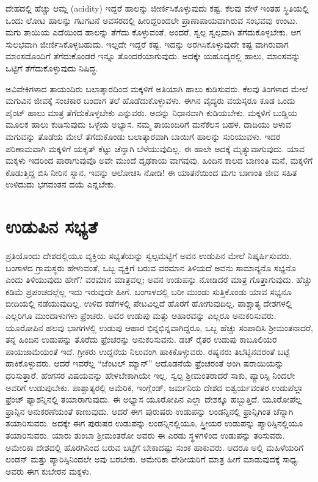 ದೇಹದಲ್ಲಿ ಹೆಚ್ಚು ಆಮ್ಲ (acidity) ಇದ್ದರೆ ಹಾಲನ್ನು ಜೀರ್ಣಿಸಿಕೊಳ್ಳುವುದು ಕಷ್ಟ. ಕೆಲವು ವೇಳೆ ಇಂತಹ ಸ್ಥಿತಿಯಲ್ಲಿ ಒಂದು ಲೋಟ ಹಾಲನ್ನು ಗಟಗಟನೆ ಅವಸರದಲ್ಲಿ ಹೀರಿದ್ದರಿಂದಲೇ ಪ್ರಾಣಾಪಾಯವಾಗಿರುವ ಸಂಭವವು ಉಂಟು. ಮಗು ತಾಯಿಯ ಎದೆಯಿಂದ ಹಾಲನ್ನು ತೆಗೆದು ಕೊಳ್ಳುವಂತೆ, ಅಂದರೆ, ಸ್ವಲ್ಪ ಸ್ವಲ್ಪವಾಗಿ ತೆಗೆದುಕೊಳ್ಳಬೇಕು. ಆಗ ಸುಲಭವಾಗಿ ಜೀರ್ಣಿಸಿಕೊಳ್ಳಬಹುದು. ಇಲ್ಲದೇ ಇದ್ದರೆ ಕಷ್ಟ. ಇದನ್ನು ಅರಗಿಸಿಕೊಳ್ಳು\break ವುದೇ ಕಷ್ಟ ವಾಗಿರುವಾಗ ಮಾಂಸದೊಂದಿಗೆ ತೆಗೆದುಕೊಂಡರೆ ಇನ್ನೂ ತೊಂದರೆಯಾಗು\break ವುದು. ಅದಕ್ಕೇ ಯಹೂದ್ಯರಲ್ಲಿ ಹಾಲು, ಮಾಂಸವನ್ನು ಒಟ್ಟಿಗೆ ತೆಗೆದುಕೊಳ್ಳುವುದು ನಿಷಿದ್ಧ.

ಅವಿವೇಕಿಗಳಾದ ತಾಯಂದಿರು ಬಲಾತ್ಕಾರದಿಂದ ಮಕ್ಕಳಿಗೆ ಅತಿಯಾಗಿ ಹಾಲು ಕುಡಿಸುವರು. ಕೆಲವು ತಿಂಗಳಾದ ಮೇಲೆ ಮಗುವಿನ ಜೀವಕ್ಕೆ ಸಂಚಕಾರ ಬಂದಾಗ ತಲೆ ಹೊಡೆದುಕೊಳ್ಳುವಳು. ಈಗಿನ ವೈದ್ಯರು ವಯಸ್ಕರೂ ಕೂಡ ಒಂದು ಪೈಂಟ್​ ಹಾಲು ಮಾತ್ರ ತೆಗೆದುಕೊಳ್ಳಬೇಕು ಎನ್ನುವರು. ಅದನ್ನು ನಿಧಾನವಾಗಿ ಕುಡಿಯಬೇಕು. ಮಕ್ಕಳಿಗೆ ಬುಡ್ಡಿಯ ಮೂಲಕ ಹಾಲು ಕುಡಿಸುವುದು ಒಳ್ಳೆಯ ಅಭ್ಯಾಸ. ನಮ್ಮ ತಾಯಂದಿರಿಗೆ ಮನೆಕೆಲಸ ಬಹಳ. ದಾದಿಯು ಅಳುವ ಮಗುವನ್ನು ತೊಡೆಯ ಮೇಲೆ ತೆಗೆದುಕೊಂಡು ಬಲಾತ್ಕಾರವಾಗಿ ಬಾಯಿಗೆ ಹಾಲನ್ನು ಸುರಿಯುವಳು. ಇದರ ಪರಿಣಾಮವಾಗಿ ಮಕ್ಕಳಿಗೆ ಯಕೃತ್​ ಕೆಟ್ಟು ಚೆನ್ನಾಗಿ ಬೆಳೆಯುವುದಿಲ್ಲ. ಈ ಹಾಲೇ ಅದಕ್ಕೆ ಮೃತ್ಯುವಾಗುವುದು. ಯಾವ ಮಕ್ಕಳು ಇದರಿಂದ ಪಾರಾಗುವುವೊ ಅವೇ ಮುಂದೆ ದೃಢಕಾಯ ವಾಗವುವು. ಹಿಂದಿನ ಕಾಲದ ಬಾಣಂತಿ ಮನೆ, ಮಕ್ಕಳಿಗೆ ಕೊಡುತ್ತಿದ್ದ ಬಿಸಿ ನೀರಿನ ಸ್ನಾನ, ಇವನ್ನು ಆಲೋಚಿಸಿ ನೋಡಿ! ಈ ಯಾತನೆಯಿಂದ ಮಗು ಬಾಣಂತಿ ಜೀವ ಸಹಿತ ಉಳಿದುದು ಭಗವಂತನ ದಯೆ ಎನ್ನಬೇಕು.

\newpage

\section*{ಉಡುಪಿನ ಸಭ್ಯತೆ}

ಪ್ರತಿಯೊಂದು ದೇಶದಲ್ಲಿಯೂ ವ್ಯಕ್ತಿಯ ಸಭ್ಯತೆಯನ್ನು ಸ್ವಲ್ಪಮಟ್ಟಿಗೆ ಅವನ ಉಡುಪಿನ ಮೇಲೆ ನಿಷ್ಕರ್ಷಿಸುವರು. ಬಂಗಾಳದ ಗ್ರಾಮಸ್ಥರು ಹೇಳುವಂತೆ, ಒಬ್ಬ ವ್ಯಕ್ತಿಗೆ ಬರುವ ವರಮಾನ ತಿಳಿಯದೆ ಅವನು ಸಾಮಾನ್ಯನೊ ಸಭ್ಯನೊ ಎಂದು ತಿಳಿಯುವುದು ಹೇಗೆ? ವರಮಾನ ಮಾತ್ರವಲ್ಲ; ಅವನ ಉಡುಪನ್ನು ನೋಡಿದರೆ ಮಾತ್ರ ಗೊತ್ತಾಗುವುದು. ಹೆಚ್ಚು ಕಡಿಮೆ ಪ್ರಪಂಚದಲ್ಲೆಲ್ಲ ಇದು ಇರುವುದೇ ಹೀಗೆ. ಬಂಗಾಳದಲ್ಲಿ ಬರೀ ಮುಂಡು ಸುತ್ತಿಕೊಂಡು ಯಾವ ಸಭ್ಯನೂ ಬೀದಿಯಲ್ಲಿ ನಡೆಯುವುದಿಲ್ಲ. ಉಳಿದ ಕಡೆಗಳಲ್ಲಿ ಪೇಟವಿಲ್ಲದೆ ಹೊರಗೆ ಹೋಗುವುದಿಲ್ಲ. ಪಾಶ್ಚಾತ್ಯ ದೇಶಗಳಲ್ಲಿ ಎಲ್ಲರಿಗೂ ಮುಂದಾಳುಗಳು ಫ್ರೆಂಚರು. ಅವರ ಉಡುಪು ಮತ್ತು ಆಹಾರವನ್ನು ಎಲ್ಲರೂ ಅನುಕರಿಸುವರು. ಯೂರೋಪಿನ ಹಲವು ಭಾಗಗಳಲ್ಲಿ ಉಡುಪು ಆಹಾರ ಭಿನ್ನಭಿನ್ನವಾಗಿದ್ದರೂ, ಒಬ್ಬ ಹೆಚ್ಚು ಸಂಪಾದಿಸಿ ಶ‍್ರೀಮಂತನಾದರೆ, ತನ್ನ ಹಿಂದಿನ ಉಡುಪನ್ನು ತೊರೆದು ಫ್ರೆಂಚರನ್ನು ಅನುಕರಿಸುವನು. ಡಚ್​ ರೈತರ ಉಡುಪು ಕಾಬೂಲಿಯರ ಪಾಯಜಾಮೆಯಂತೆ ಇದೆ. ಗ್ರೀಕರು ಉದ್ದನೆಯ ನಿಲುವಂಗಿ ಹಾಕಿಕೊಳ್ಳುವರು. ರಷ್ಯನರು ತಿಬೆಟ್ಟಿನವರಂತೆ ಬಟ್ಟೆ ಹಾಕಿಕೊಳ್ಳುವರು. ಆದರೆ ಇವರೆಲ್ಲ “ಜೆಂಟಲ್​ ಮ್ಯಾನ್​” ಆದೊಡನೆಯೆ ಫ್ರೆಂಚರಂತೆ ಅಂಗಿ ಷರಾಯಿಯನ್ನು ಧರಿಸುತ್ತಾರೆ. ಹೆಂಗಸರ ವಿಷಯವನ್ನು ಹೇಳಬೇಕಾಗಿಯೇ ಇಲ್ಲ. ಸ್ವಲ್ಪ ಶ‍್ರೀಮಂತರಾದರೆ ಸಾಕು, ಪ್ಯಾರಿಸ್ಸಿ ನಿಂದಲೇ ಅವರಿಗೆ ಉಡುಪುಬೇಕು. ಪಾಶ್ಚಾತ್ಯರಲ್ಲಿ ಅಮೆರಿಕ, ಇಂಗ್ಲೆಂಡ್​, ಜರ್ಮನಿಯ ದೇಶದ ಐಶ್ವರ್ಯವಂತರ ಉಡುಪೆಲ್ಲಾ ಫ್ರೆಂಚ್​ ಫ್ಯಾಶನ್ನಿನಲ್ಲಿ ತಯಾರಾಗುವುದು. ಈ ಅಭ್ಯಾಸ ಯೂರೋಪಿನ ಎಲ್ಲಾ ದೇಶಕ್ಕೂ ಹಬ್ಬುತ್ತಿದೆ. ಯೂರೋಪೆಲ್ಲ ಫ್ರಾನ್ಸಿನ ಅನುಕರಣೆಯಂತೆ ಕಾಣುವುದು. ಆದರೆ ಈಗ ಪುರುಷರು ಉಡುಪನ್ನು ಲಂಡನ್ನಿನಲ್ಲಿ ಫ್ರಾನ್ಸಿಗಿಂತ ಚೆನ್ನಾಗಿ ತಯಾರಿಸುವರು. ಅದಕ್ಕೇ ಈಗ ಪುರುಷರ ಉಡುಪನ್ನು ಲಂಡನ್ನಿನಲ್ಲಿಯೂ, ಸ್ತ್ರೀಯರ ಉಡುಪನ್ನು ಪ್ಯಾರಿಸ್ಸಿನಲ್ಲಿಯೂ ತಯಾರಿಸುವರು. ಯಾರು ತುಂಬಾ ಶ‍್ರೀಮಂತರೋ ಅವರು ಈ ಎರಡು ಸ್ಥಳಗಳಿಂದ ಉಡುಪನ್ನು ತರಿಸುವರು. ಅಮೇರಿಕಾ ದೇಶದಲ್ಲಿ ಹೊರಗಿನಿಂದ ಬರುವ ಬಟ್ಟೆಗೆ ಬೇಕಾದಷ್ಟು ಸುಂಕ ಹಾಕುವರು. ಆದರೂ ಅಲ್ಲಿ ಮಹಿಳೆಯರಿಗೆ ಲಂಡನ್​ ಮತ್ತು ಪ್ಯಾರಿಸ್ಸಿನಿಂದಲೇ ಅವು ಬರಬೇಕು. ಅಮೇರಿಕಾ ದೇಶೀಯರಿಗೆ ಮಾತ್ರ ಹೀಗೆ ಮಾಡುವುದಕ್ಕೆ ಸಾಧ್ಯ. ಅವರು ಈಗ ಕುಬೇರನ ಮಕ್ಕಳು.


